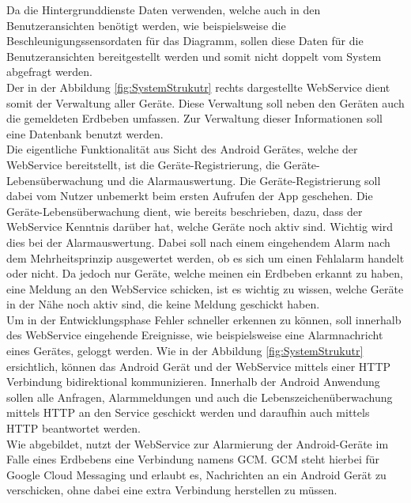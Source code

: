 Da die Hintergrunddienste Daten verwenden, welche auch in den Benutzeransichten benötigt werden, wie beispielsweise die Beschleunigungssensordaten für das Diagramm, sollen diese Daten für die Benutzeransichten bereitgestellt werden und somit nicht doppelt vom System abgefragt werden.\\
Der in der Abbildung \ref{fig:SystemStrukutr} rechts dargestellte WebService dient somit der Verwaltung aller Geräte. Diese Verwaltung soll neben den Geräten auch die gemeldeten Erdbeben umfassen. Zur Verwaltung dieser Informationen soll eine Datenbank benutzt werden.\\
Die eigentliche Funktionalität aus Sicht des Android Gerätes, welche der WebService bereitstellt, ist die Geräte-Registrierung, die Geräte-Lebensüberwachung und die Alarmauswertung. Die Geräte-Registrierung soll dabei vom Nutzer unbemerkt beim ersten Aufrufen der App geschehen. Die Geräte-Lebensüberwachung dient, wie bereits beschrieben, dazu, dass der WebService Kenntnis darüber hat, welche Geräte noch aktiv sind. Wichtig wird dies bei der Alarmauswertung. Dabei soll nach einem eingehendem Alarm nach dem Mehrheitsprinzip ausgewertet werden, ob es sich um einen Fehlalarm handelt oder nicht. Da jedoch nur Geräte, welche meinen ein Erdbeben erkannt zu haben, eine Meldung an den WebService schicken, ist es wichtig zu wissen, welche Geräte in der Nähe noch aktiv sind, die keine Meldung geschickt haben.\\
Um in der Entwicklungsphase Fehler schneller erkennen zu können, soll innerhalb des WebService eingehende Ereignisse, wie beispielsweise eine Alarmnachricht eines Gerätes, geloggt werden. Wie in der Abbildung \ref{fig:SystemStrukutr} ersichtlich, können das Android Gerät und der WebService mittels einer HTTP Verbindung bidirektional kommunizieren. Innerhalb der Android Anwendung sollen alle Anfragen, Alarmmeldungen und auch die Lebenszeichenüberwachung mittels HTTP an den Service geschickt werden und daraufhin auch mittels HTTP beantwortet werden.\\
Wie abgebildet, nutzt der WebService zur Alarmierung der Android-Geräte im Falle eines Erdbebens eine Verbindung namens GCM. GCM steht hierbei für Google Cloud Messaging und erlaubt es, Nachrichten an ein Android Gerät zu verschicken, ohne dabei eine extra Verbindung herstellen zu müssen.
\newpage